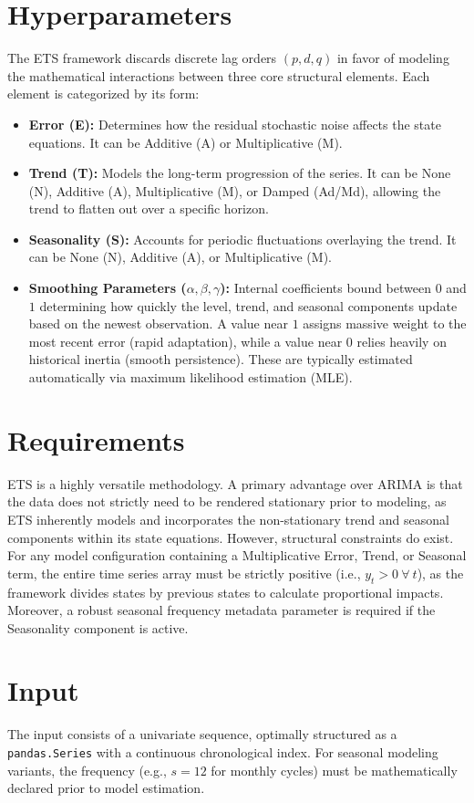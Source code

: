 \section{Hyperparameters}
The ETS framework discards discrete lag orders $(p,d,q)$ in favor of modeling the mathematical interactions between three core structural elements. Each element is categorized by its form:
\begin{itemize}
    \item \textbf{Error (E):} Determines how the residual stochastic noise affects the state equations. It can be Additive (A) or Multiplicative (M).
    \item \textbf{Trend (T):} Models the long-term progression of the series. It can be None (N), Additive (A), Multiplicative (M), or Damped (Ad/Md), allowing the trend to flatten out over a specific horizon.
    \item \textbf{Seasonality (S):} Accounts for periodic fluctuations overlaying the trend. It can be None (N), Additive (A), or Multiplicative (M).
    \item \textbf{Smoothing Parameters ($\alpha, \beta, \gamma$):} Internal coefficients bound between $0$ and $1$ determining how quickly the level, trend, and seasonal components update based on the newest observation. A value near $1$ assigns massive weight to the most recent error (rapid adaptation), while a value near $0$ relies heavily on historical inertia (smooth persistence). These are typically estimated automatically via maximum likelihood estimation (MLE).
\end{itemize}

\section{Requirements}
ETS is a highly versatile methodology. A primary advantage over ARIMA is that the data does not strictly need to be rendered stationary prior to modeling, as ETS inherently models and incorporates the non-stationary trend and seasonal components within its state equations. However, structural constraints do exist. For any model configuration containing a Multiplicative Error, Trend, or Seasonal term, the entire time series array must be strictly positive (i.e., $y_t > 0 \ \forall \ t$), as the framework divides states by previous states to calculate proportional impacts. Moreover, a robust seasonal frequency metadata parameter is required if the Seasonality component is active.

\section{Input}
The input consists of a univariate sequence, optimally structured as a \texttt{pandas.Series} with a continuous chronological index. For seasonal modeling variants, the frequency (e.g., $s=12$ for monthly cycles) must be mathematically declared prior to model estimation.

